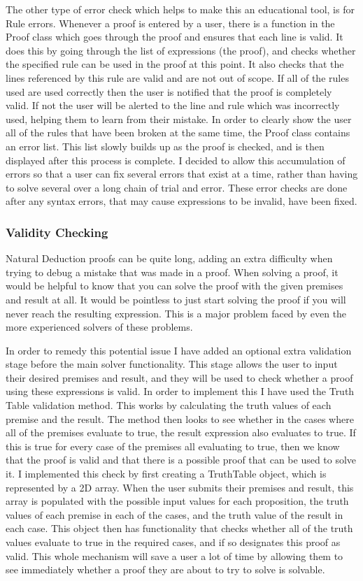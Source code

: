 The other type of error check which helps to make this an educational tool, is for Rule errors. Whenever a proof is entered by a user, there is a function in the Proof class which goes through the proof and ensures that each line is valid. It does this by going through the list of expressions (the proof), and checks whether the specified rule can be used in the proof at this point. It also checks that the lines referenced by this rule are valid and are not out of scope. If all of the rules used are used correctly then the user is notified that the proof is completely valid. If not the user will be alerted to the line and rule which was incorrectly used, helping them to learn from their mistake. In order to clearly show the user all of the rules that have been broken at the same time, the Proof class contains an error list. This list slowly builds up as the proof is checked, and is then displayed after this process is complete. I decided to allow this accumulation of errors so that a user can fix several errors that exist at a time, rather than having to solve several over a long chain of trial and error. These error checks are done after any syntax errors, that may cause expressions to be invalid, have been fixed.

\subsubsection{Validity Checking}
Natural Deduction proofs can be quite long, adding an extra difficulty when trying to debug a mistake that was made in a proof. When solving a proof, it would be helpful to know that you can solve the proof with the given premises and result at all. It would be pointless to just start solving the proof if you will never reach the resulting expression. This is a major problem faced by even the more experienced solvers of these problems.

In order to remedy this potential issue I have added an optional extra validation stage before the main solver functionality. This stage allows the user to input their desired premises and result, and they will be used to check whether a proof using these expressions is valid. In order to implement this I have used the Truth Table validation method. This works by calculating the truth values of each premise and the result. The method then looks to see whether in the cases where all of the premises evaluate to true, the result expression also evaluates to true. If this is true for every case of the premises all evaluating to true, then we know that the proof is valid and that there is a possible proof that can be used to solve it. I implemented this check by first creating a TruthTable object, which is represented by a 2D array. When the user submits their premises and result, this array is populated with the possible input values for each proposition, the truth values of each premise in each of the cases, and the truth value of the result in each case. This object then has functionality that checks whether all of the truth values evaluate to true in the required cases, and if so designates this proof as valid. This whole mechanism will save a user a lot of time by allowing them to see immediately whether a proof they are about to try to solve is solvable.

